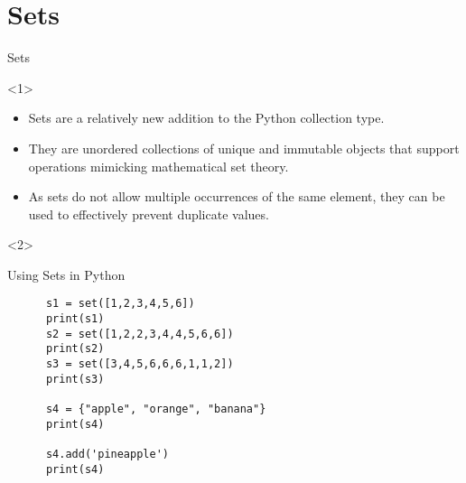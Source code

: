 \section{Sets}
\label{sec:sets}

\begin{frame}[fragile]{Sets}
  \begin{onlyenv}<1>
      \begin{itemize} \parskip3mm \justifying
      \item Sets are a relatively new addition to the Python collection type. 
      \item They are unordered collections of unique and immutable objects that support operations mimicking mathematical set theory. 
      \item As sets do not allow multiple occurrences of the same element, they can be used to effectively prevent duplicate values.
  \end{itemize}
\end{onlyenv}

\begin{onlyenv}<2>
  \begin{exercise}{Using Sets in Python}
    \begin{lstlisting}
      s1 = set([1,2,3,4,5,6])
      print(s1)
      s2 = set([1,2,2,3,4,4,5,6,6])
      print(s2)
      s3 = set([3,4,5,6,6,6,1,1,2])
      print(s3)

      s4 = {"apple", "orange", "banana"}
      print(s4)

      s4.add('pineapple')
      print(s4)
    \end{lstlisting}
  \end{exercise}
\end{onlyenv}

\end{frame}


